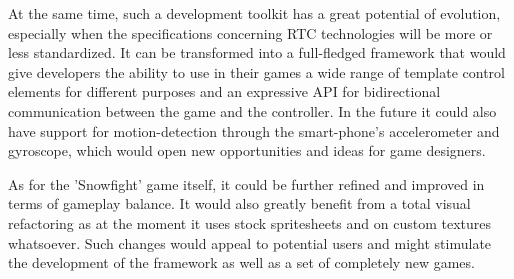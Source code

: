 At the same time, such a development toolkit has a great potential of evolution,
especially when the specifications concerning RTC technologies will be more or
less standardized. It can be transformed into a full-fledged framework that
would give developers the ability to use in their games a wide range of template
control elements for different purposes and an expressive API for bidirectional
communication between the game and the controller. In the future it could also
have support for motion-detection through the smart-phone's accelerometer and
gyroscope, which would open new opportunities and ideas for game designers.

As for the 'Snowfight' game itself, it could be further refined and improved in
terms of gameplay balance. It would also greatly benefit from a total visual
refactoring as at the moment it uses stock spritesheets and on custom textures
whatsoever. Such changes would appeal to potential users and might stimulate
the development of the framework as well as a set of completely new games.



\clearpage
